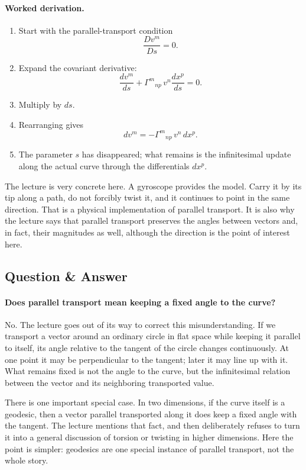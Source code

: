 \paragraph{Worked derivation.}
\begin{enumerate}
\item Start with the parallel-transport condition
\[
\frac{D v^{m}}{Ds}=0.
\]
\item Expand the covariant derivative:
\[
\frac{dv^{m}}{ds}
+
\Gamma^{m}{}_{np}\,v^{n}\frac{dx^{p}}{ds}=0.
\]
\item Multiply by \(ds\).
\item Rearranging gives
\[
dv^{m}=-\Gamma^{m}{}_{np}\,v^{n}\,dx^{p}.
\]
\item The parameter \(s\) has disappeared; what remains is the infinitesimal update along the actual curve through the differentials \(dx^{p}\).
\end{enumerate}

The lecture is very concrete here. A gyroscope provides the model. Carry it by its tip along a path, do not forcibly twist it, and it continues to point in the same direction. That is a physical implementation of parallel transport. It is also why the lecture says that parallel transport preserves the angles between vectors and, in fact, their magnitudes as well, although the direction is the point of interest here.

\subsection{Question \& Answer}

\paragraph{Does parallel transport mean keeping a fixed angle to the curve?}

No. The lecture goes out of its way to correct this misunderstanding. If we transport a vector around an ordinary circle in flat space while keeping it parallel to itself, its angle relative to the tangent of the circle changes continuously. At one point it may be perpendicular to the tangent; later it may line up with it. What remains fixed is not the angle to the curve, but the infinitesimal relation between the vector and its neighboring transported value.

There is one important special case. In two dimensions, if the curve itself is a geodesic, then a vector parallel transported along it does keep a fixed angle with the tangent. The lecture mentions that fact, and then deliberately refuses to turn it into a general discussion of torsion or twisting in higher dimensions. Here the point is simpler: geodesics are one special instance of parallel transport, not the whole story.

